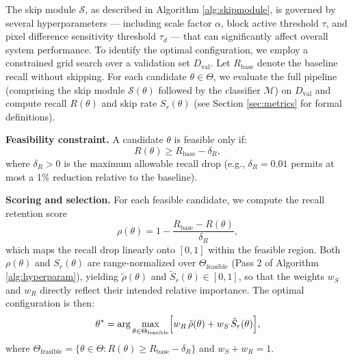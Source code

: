 \documentclass[
  10pt,
]{article}
\begin{document}
The skip module $\mathcal{S}$, as described in Algorithm \ref{alg:skipmodule},
is governed by several hyperparameters --- including scale factor $\alpha$,
block active threshold $\tau$, and pixel difference sensitivity threshold
$\tau_d$ --- that can significantly affect overall system performance. To
identify the optimal configuration, we employ a constrained grid search over a
validation set $D_{\text{val}}$. Let $R_{\text{base}}$ denote the baseline
recall without skipping. For each candidate $\theta \in \Theta$, we evaluate the
full pipeline (comprising the skip module $\mathcal{S}(\theta)$ followed by the
classifier $\mathcal{M}$) on $D_{\text{val}}$ and compute recall $R(\theta)$ and
skip rate $S_r(\theta)$ (see Section \ref{sec:metrics} for formal definitions).

\textbf{Feasibility constraint.} A candidate $\theta$ is feasible only if:
\begin{equation}
    R(\theta) \geq R_{\text{base}} - \delta_R,
\end{equation}
where $\delta_R > 0$ is the maximum allowable recall drop (e.g.,
$\delta_R = 0.01$ permits at most a 1\% reduction relative to the baseline).

\textbf{Scoring and selection.} For each feasible candidate, we compute the
recall retention score
\begin{equation}\label{eq:rho}
    \rho(\theta) = 1 - \frac{R_{\text{base}} - R(\theta)}{\delta_R},
\end{equation}
which maps the recall drop linearly onto $[0,1]$ within the feasible region.
Both $\rho(\theta)$ and $S_r(\theta)$ are range-normalized over
$\Theta_{\text{feasible}}$ (Pass 2 of Algorithm \ref{alg:hyperparam}),
yielding $\tilde{\rho}(\theta)$ and $\tilde{S}_r(\theta) \in [0,1]$, so that
the weights $w_S$ and $w_R$ directly reflect their intended relative importance.
The optimal configuration is then:
\begin{equation}
    \theta^*
    = \arg\max_{\theta \in \Theta_{\text{feasible}}}
    \Bigl[ w_R\,\tilde{\rho}(\theta) + w_S\,\tilde{S}_r(\theta) \Bigr],
\end{equation}
where $\Theta_{\text{feasible}} = \{\theta \in \Theta : R(\theta) \geq
R_{\text{base}} - \delta_R\}$ and $w_S + w_R = 1$.
\end{document}
